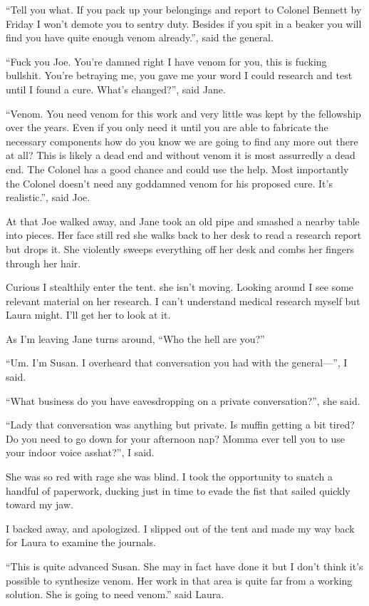 ``Tell you what. If you pack up your belongings and report to Colonel Bennett by Friday I won't demote you to sentry duty. Besides if you spit in a beaker you will find you have quite enough venom already.'', said the general.

``Fuck you Joe. You're damned right I have venom for you, this is fucking bullshit. You're betraying me, you gave me your word I could research and test until I found a cure. What's changed?'', said Jane.

``Venom. You need venom for this work and very little was kept by the fellowship over the years. Even if you only need it until you are able to fabricate the necessary components how do you know we are going to find any more out there at all? This is likely a dead end and without venom it is most assurredly a dead end. The Colonel has a good chance and could use the help. Most importantly the Colonel doesn't need any goddamned venom for his proposed cure. It's realistic.'', said Joe.

At that Joe walked away, and Jane took an old pipe and smashed a nearby table into pieces. Her face still red she walks back to her desk to read a research report but drops it. She violently sweeps everything off her desk and combs her fingers through her hair.

Curious I stealthily enter the tent. she isn't moving. Looking around I see some relevant material on her research. I can't understand medical research myself but Laura might. I'll get her to look at it.

As I'm leaving Jane turns around, ``Who the hell are you?''

``Um. I'm Susan. I overheard that conversation you had with the general---'', I said.

``What business do you have eavesdropping on a private conversation?'', she said.

``Lady that conversation was anything but private. Is muffin getting a bit tired? Do you need to go down for your afternoon nap? Momma ever tell you to use your indoor voice asshat?'', I said.

She was so red with rage she was blind. I took the opportunity to snatch a handful of paperwork, ducking just in time to evade the fist that sailed quickly toward my jaw.

I backed away, and apologized. I slipped out of the tent and made my way back for Laura to examine the journals.

``This is quite advanced Susan. She may in fact have done it but I don't think it's possible to synthesize venom. Her work in that area is quite far from a working solution. She is going to need venom.'' said Laura.

